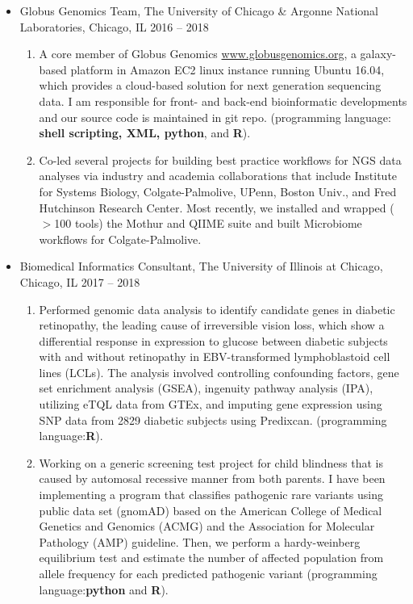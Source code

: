 \documentclass[letterpaper,11pt]{article}
\begin{document}
\begin{itemize}
\item
	{Globus Genomics Team, The University of Chicago \& Argonne National Laboratories, Chicago, IL \cftdotfill{\cftsecdotsep} 2016 -- 2018}\\
  \begin{enumerate}[1)]
    \item
	  A core member of Globus Genomics \href{http://www.globusgenomics.org}{www.globusgenomics.org}, a galaxy-based platform in Amazon EC2 linux instance running Ubuntu 16.04, which provides a cloud-based solution for next generation sequencing data. I am responsible for front- and back-end bioinformatic developments and our source code is maintained in git repo.  (programming language: \textbf{shell scripting, XML, python}, and \textbf{R}). \\
    \item
    Co-led several projects for building best practice workflows for NGS data analyses via industry and academia collaborations that include Institute for Systems Biology, Colgate-Palmolive, UPenn, Boston Univ., and Fred Hutchinson Research Center. Most recently, we installed and wrapped ($>$100 tools) the Mothur and QIIME suite and built Microbiome workflows for Colgate-Palmolive.   
   \end{enumerate}  
\item   
	{Biomedical Informatics Consultant, The University of Illinois at Chicago, Chicago, IL \cftdotfill{\cftsecdotsep} 2017 -- 2018}\\
  \begin{enumerate}[1)]
    \item
    Performed genomic data analysis to identify candidate genes in diabetic retinopathy, the leading cause of irreversible vision loss, which show a differential response in expression to glucose between diabetic subjects with and without retinopathy in
EBV-transformed lymphoblastoid cell lines (LCLs). The analysis involved controlling confounding factors, gene set enrichment analysis (GSEA), ingenuity pathway analysis (IPA), utilizing eTQL data from GTEx, and imputing gene expression using SNP data from 2829 diabetic subjects using Predixcan. (programming language:\textbf{R}). \\ 
    \item
    Working on a generic screening test project for child blindness that is caused by automosal recessive manner from both parents.  I have been implementing a program that classifies pathogenic rare variants using public data set (gnomAD) based on the American College of Medical Genetics and Genomics (ACMG) and the Association for Molecular Pathology (AMP) guideline. Then, we perform a hardy-weinberg equilibrium test and estimate the number of affected population from allele frequency for each predicted pathogenic variant  (programming language:\textbf{python} and \textbf{R}). \\
  \end{enumerate}


\end{itemize}
\end{document}
